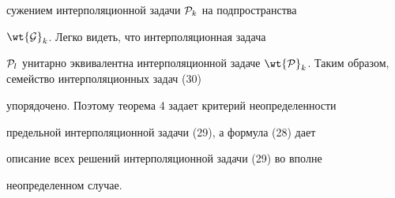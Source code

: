 \begin{exam}
сужением интерполяционной задачи ${\cal P}_k$ на подпространства


$\wt {\cal G}_k$. Легко видеть, что интерполяционная задача


${\cal P}_l$ унитарно эквивалентна интерполяционной задаче $\wt


{\cal P}_k $. Таким образом, семейство интерполяционных задач (30)


упорядочено. Поэтому теорема 4 задает критерий неопределенности


предельной интерполяционной задачи (29), а формула (28) дает


описание всех решений интерполяционной задачи (29) во вполне


неопределенном случае.


\end{exam}





